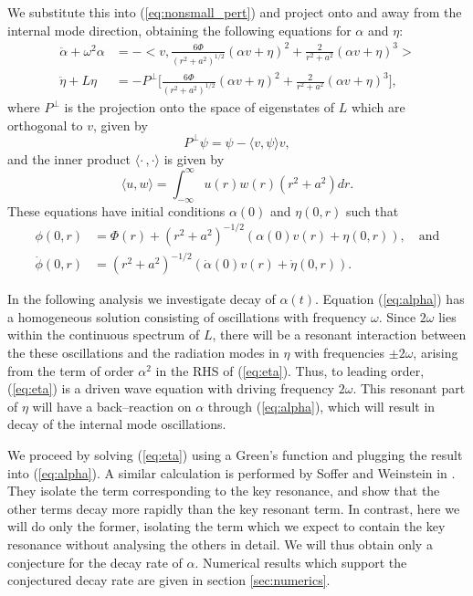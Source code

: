 We substitute this into (\ref{eq:nonsmall_pert}) and project onto and away from the internal mode direction, obtaining the following equations for $\alpha$ and $\eta$:
\begin{align}
\ddot{\alpha} + \omega^2\alpha &= - \bigg< v, \frac{6\Phi}{(r^2+a^2)^{1/2}} (\alpha v + \eta)^2 + \frac{2}{r^2+a^2} (\alpha v + \eta)^3 \bigg> \label{eq:alpha}\\
\ddot{\eta} + L\eta &= - P^\perp\bigg[\frac{6\Phi}{(r^2+a^2)^{1/2}} (\alpha v + \eta)^2 + \frac{2}{r^2+a^2} (\alpha v + \eta)^3 \bigg],\label{eq:eta}
\end{align}
where $P^\perp$ is the projection onto the space of eigenstates of $L$ which are orthogonal to $v$, given by
\[
P^\perp\psi = \psi - \langle v,\psi\rangle v,
\]
and the inner product $\langle \cdot\,,\cdot\rangle$ is given by
\[
\langle u, w \rangle = \int_{-\infty}^{\infty}u(r)w(r)(r^2+a^2)dr.
\]
These equations have initial conditions $\alpha(0)$ and $\eta(0,r)$ such that
\begin{align*}
\phi(0,r) &= \Phi(r) + (r^2+a^2)^{-1/2}(\alpha(0)v(r) + \eta(0,r)), \quad \mathrm{and} \\
\dot{\phi}(0,r) &= (r^2+a^2)^{-1/2}(\dot{\alpha}(0)v(r) + \dot{\eta}(0,r)).
\end{align*}

In the following analysis we investigate decay of $\alpha(t)$. Equation (\ref{eq:alpha}) has a homogeneous solution consisting of oscillations with frequency $\omega$. Since $2\omega$ lies within the continuous spectrum of $L$, there will be a resonant interaction between the these oscillations and the radiation modes in $\eta$ with frequencies $\pm 2 \omega$, arising from the term of order $\alpha^2$ in the RHS of (\ref{eq:eta}). Thus, to leading order, (\ref{eq:eta}) is a driven wave equation with driving frequency $2\omega$. This resonant part of $\eta$ will have a back--reaction on $\alpha$ through (\ref{eq:alpha}), which will result in decay of the internal mode oscillations.

We proceed by solving (\ref{eq:eta}) using a Green's function and plugging the result into (\ref{eq:alpha}). A similar calculation is performed by Soffer and Weinstein in \cite{SW99}. They isolate the term corresponding to the key resonance, and show that the other terms decay more rapidly than the key resonant term. In contrast, here we will do only the former, isolating the term which we expect to contain the key resonance without analysing the others in detail. We will thus obtain only a conjecture for the decay rate of $\alpha$. Numerical results which support the conjectured decay rate are given in section \ref{sec:numerics}.



